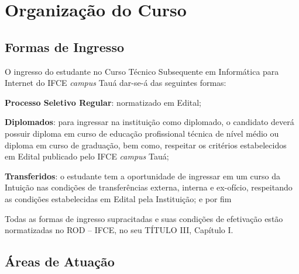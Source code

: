 \documentclass[
	12pt,				%
	openright,			%
	twoside,			%
	a4paper,			%
	chapter=TITLE,		%
	english,			%
	french,				%
	spanish,			%
	brazil,				%
	]{abntex2}
\begin{document}
\chapter{Organização do Curso}


\section{Formas de Ingresso}


O ingresso do estudante no Curso Técnico Subsequente em Informática para Internet do IFCE \textit{campus} Tauá dar-se-á das seguintes formas:

\begin{alineas}
    \item \textbf{Processo Seletivo Regular}: normatizado em Edital;
    
    \item \textbf{Diplomados}: para ingressar na instituição como diplomado, o candidato deverá possuir diploma em curso de educação profissional técnica de nível médio ou diploma em curso de graduação, bem como, respeitar os critérios estabelecidos em Edital publicado pelo IFCE \textit{campus} Tauá;
    
    \item \textbf{Transferidos}: o estudante tem a oportunidade de ingressar em um curso da Intuição nas condições de transferências externa, interna e ex-ofício, respeitando as condições estabelecidas em Edital pela Instituição; e por fim
    
\end{alineas}

Todas as formas de ingresso supracitadas e suas condições de efetivação estão normatizadas no  ROD -- IFCE, no seu TÍTULO III, Capítulo I.


\section{Áreas de Atuação}
\end{document}
